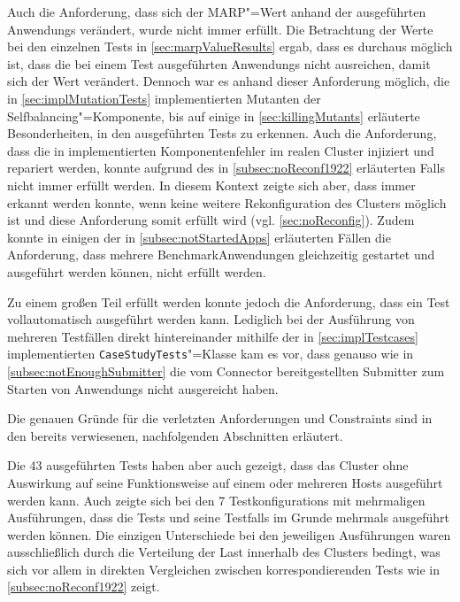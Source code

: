 Auch die Anforderung, dass sich der MARP"=Wert anhand der ausgeführten \glspl{Anwendung} verändert, wurde nicht immer erfüllt.
Die Betrachtung der Werte bei den einzelnen \glspl{Test} in \cref{sec:marpValueResults} ergab, dass es durchaus möglich ist, dass die bei einem \gls{Test} ausgeführten \glspl{Anwendung} nicht ausreichen, damit sich der Wert verändert.
Dennoch war es anhand dieser Anforderung möglich, die in \cref{sec:implMutationTests} implementierten Mutanten der Selfbalancing"=Komponente, bis auf einige in \cref{sec:killingMutants} erläuterte Besonderheiten, in den ausgeführten \glspl{Test} zu erkennen.
Auch die Anforderung, dass die in  implementierten Komponentenfehler im realen Cluster injiziert und repariert werden, konnte aufgrund des in \cref{subsec:noReconf1922} erläuterten Falls nicht immer erfüllt werden.
In diesem Kontext zeigte sich aber, dass immer erkannt werden konnte, wenn keine weitere Rekonfiguration des Clusters möglich ist und diese Anforderung somit erfüllt wird (vgl. \cref{sec:noReconfig}).
Zudem konnte in einigen der in \cref{subsec:notStartedApps} erläuterten Fällen die Anforderung, dass mehrere Benchmark\gls{Anwendung}en gleichzeitig gestartet und ausgeführt werden können, nicht erfüllt werden.

Zu einem großen Teil erfüllt werden konnte jedoch die Anforderung, dass ein \gls{Test} vollautomatisch ausgeführt werden kann.
Lediglich bei der Ausführung von mehreren Testfällen direkt hintereinander mithilfe der in \cref{sec:implTestcases} implementierten \texttt{CaseStudyTests}"=Klasse kam es vor, dass genauso wie in \cref{subsec:notEnoughSubmitter} die vom Connector bereitgestellten Submitter zum Starten von \glspl{Anwendung} nicht ausgereicht haben.

Die genauen Gründe für die verletzten Anforderungen und Constraints sind in den bereits verwiesenen, nachfolgenden Abschnitten erläutert.

Die 43 ausgeführten \glspl{Test} haben aber auch gezeigt, dass das Cluster ohne Auswirkung auf seine Funktionsweise auf einem oder mehreren Hosts ausgeführt werden kann.
Auch zeigte sich bei den 7 \glspl{Testkonfiguration} mit mehrmaligen Ausführungen, dass die \glspl{Test} und seine \glspl{Testfall} im Grunde mehrmals ausgeführt werden können.
Die einzigen Unterschiede bei den jeweiligen Ausführungen waren ausschließlich durch die Verteilung der Last innerhalb des Clusters bedingt, was sich vor allem in direkten Vergleichen zwischen korrespondierenden \glspl{Test} wie \zB in \cref{subsec:noReconf1922} zeigt.
